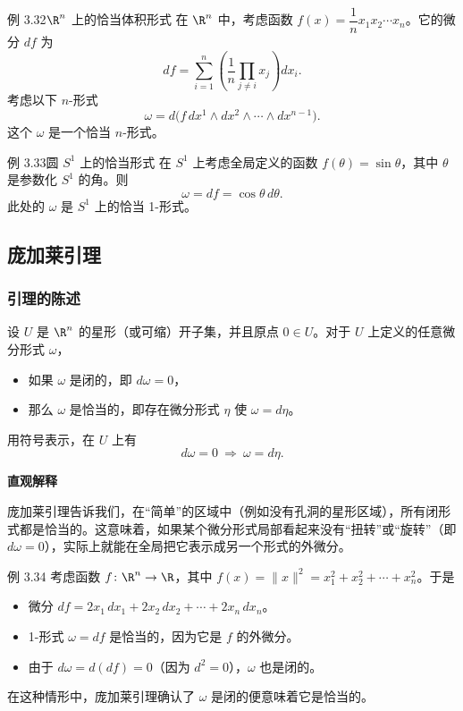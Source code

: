 \begin{statement}{例 3.32}{$\R^n$ 上的恰当体积形式}
在 $\R^n$ 中，考虑函数 $f(x)=\dfrac1n x_1x_2\cdots x_n$。它的微分 $df$ 为
\[
  df=\sum_{i=1}^n\left(\frac1n\prod_{j\ne i}x_j\right)dx_i.
\]
考虑以下 $n$-形式
\begin{equation*}
  \omega=d\bigl(f\,dx^1\wedge dx^2\wedge\cdots\wedge dx^{n-1}\bigr).
  \tag{3.5}\label{eq:3.5}
\end{equation*}
这个 $\omega$ 是一个恰当 $n$-形式。
\end{statement}

\begin{statement}{例 3.33}{圆 $S^1$ 上的恰当形式}
在 $S^1$ 上考虑全局定义的函数 $f(\theta)=\sin\theta$，其中 $\theta$ 是参数化 $S^1$ 的角。则
\[
  \omega=df=\cos\theta\,d\theta.
\]
此处的 $\omega$ 是 $S^1$ 上的恰当 1-形式。
\end{statement}

\subsection{庞加莱引理}
\subsubsection{引理的陈述}
设 $U$ 是 $\R^n$ 的星形（或可缩）开子集，并且原点 $0\in U$。对于 $U$ 上定义的任意微分形式 $\omega$，%
\begin{itemize}
\item 如果 $\omega$ 是闭的，即 $d\omega=0$，
\item 那么 $\omega$ 是恰当的，即存在微分形式 $\eta$ 使 $\omega=d\eta$。
\end{itemize}
用符号表示，在 $U$ 上有
\begin{equation*}
  d\omega=0\ \Longrightarrow\ \omega=d\eta.
  \tag{3.6}\label{eq:3.6}
\end{equation*}

\noindent\textbf{直观解释}\par
庞加莱引理告诉我们，在“简单”的区域中（例如没有孔洞的星形区域），所有闭形式都是恰当的。这意味着，如果某个微分形式局部看起来没有“扭转”或“旋转”（即 $d\omega=0$），实际上就能在全局把它表示成另一个形式的外微分。

\begin{statement}{例 3.34}{}
考虑函数 $f\colon\R^n\to\R$，其中 $f(x)=\lVert x\rVert^2=x_1^2+x_2^2+\cdots+x_n^2$。于是
\begin{itemize}
\item 微分 $df=2x_1\,dx_1+2x_2\,dx_2+\cdots+2x_n\,dx_n$。
\item 1-形式 $\omega=df$ 是恰当的，因为它是 $f$ 的外微分。
\item 由于 $d\omega=d(df)=0$（因为 $d^2=0$），$\omega$ 也是闭的。
\end{itemize}
在这种情形中，庞加莱引理确认了 $\omega$ 是闭的便意味着它是恰当的。
\end{statement}

